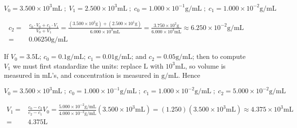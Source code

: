 \documentclass{article}
\begin{document}
\[V_0 = 3.500 \times 10^3\text{mL} \;;\; V_1 = 2.500 \times 10^3\text{mL} \;;\; c_0 = 1.000 \times 10^{-1}\text{g/mL} \;;\; c_1 = 1.000 \times 10^{-2}\text{g/mL}\]

\begin{align*}
c_2 = & \frac{c_0 \cdot V_0 + c_1 \cdot V_1}{V_0 + V_1} 
= \frac{(3.500 \times 10^2\text{g}) + (2.500 \times 10^1\text{g})}{6.000 \times 10^3\text{mL}} 
= \frac{3.750 \times 10^2\text{g}}{6.000 \times 10^3\text{mL}} 
\approx 6.250 \times 10^{-2}\text{g/mL} \\
= & 0.06250 \text{g/mL}
\end{align*}

\vspace{5mm}

If \(V_0 = 3.5\text{L}\); \(c_0 = 0.1\text{g/mL}\); \(c_1 = 0.01\text{g/mL}\); and \(c_2 = 0.05\text{g/mL}\); then to compute \(V_1\) we must first standardize the units: replace \(\text{L}\) with \(10^3\text{mL}\), so volume is measured in \(\text{mL}\)'s, and concentration is measured in \(\text{g/mL}\). Hence 

\[V_0 = 3.500 \times 10^3\text{mL} \;;\; c_0 = 1.000 \times 10^{-1}\text{g/mL} \;;\; c_1 = 1.000 \times 10^{-2}\text{g/mL} \;;\; c_2 = 5.000 \times 10^{-2}\text{g/mL}\]

\begin{align*}
V_1 = & \frac{c_0 - c_2}{c_2 - c_1}V_0
= \frac{5.000 \times 10^{-2}\text{g/mL}}{4.000 \times 10^{-2}\text{g/mL}} (3.500 \times 10^3\text{mL})
= (1.250)(3.500 \times 10^3\text{mL}) 
\approx 4.375 \times 10^3\text{mL} \\
= & 4.375 \text{L}
\end{align*}




\end{document}
